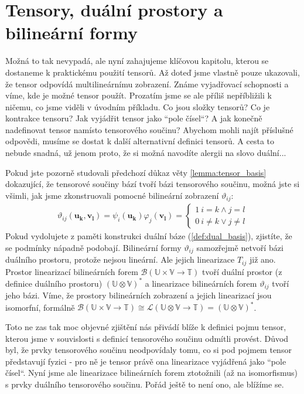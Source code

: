 \documentclass[a5paper,12pt]{amsbook}
\theoremstyle{definition}
\newcommand{\myvec}[1]{\bm{#1}}
\newcommand{\myspace}[1]{\mathbb{#1}}
\begin{document}
\section{Tensory, duální prostory a bilineární formy}

\noindent
Možná to tak nevypadá, ale nyní zahajujeme klíčovou kapitolu, kterou se dostaneme k praktickému
použití tensorů. Až doteď jsme vlastně pouze ukazovali, že tensor odpovídá multilineárnímu
zobrazení. Známe vyjadřovací schopnosti a víme, kde je možné tensor použít. Prozatím jsme
se ale příliš nepříbližili k ničemu, co jsme viděli v úvodním příkladu. Co jsou složky tensorů?
Co je kontrakce tensoru? Jak vyjádřit tensor jako ``pole čísel``? A jak konečně nadefinovat
tensor namísto tensorového součinu? Abychom mohli najít příslušné odpovědi, musíme se dostat
k další alternativní definici tensorů. A cesta to nebude snadná, už jenom proto, že si možná
navodíte alergii na slovo duální...

Pokud jste pozorně studovali předchozí důkaz věty \ref{lemma:tensor_basis} dokazující, že
tensorové součiny bází tvoří bázi tensorového součinu, možná jste si všimli, jak jsme zkonstruovali
pomocné bilineární zobrazení $\vartheta_{ij}$:
\begin{equation*}
\begin{split}
\vartheta_{ij}(\myvec{u_k}, \myvec{v_l}) = \psi_i(\myvec{u_k})\varphi_j(\myvec{v_l}) =
\begin{cases}
1 \: i = k \wedge j = l \\
0 \: i \neq k \vee j \neq l
\end{cases}
\end{split}
\end{equation*}
Pokud vydolujete z paměti konstrukci duální báze (\ref{def:dual_basis}), zjistíte, že se podmínky
nápadně podobají. Bilineární formy $\vartheta_{ij}$ samozřejmě netvoří bázi duálního prostoru,
protože nejsou lineární. Ale jejich linearizace $T_{ij}$ již ano. Prostor linearizací bilineárních
forem $\mathcal{B}(\myspace{U}\times\myspace{V}\rightarrow\myspace{T})$ tvoří duální prostor
(z definice duálního prostoru) $(\myspace{U}\otimes\myspace{V})^*$ a linearizace bilineárních
forem $\vartheta_{ij}$ tvoří jeho bázi. Víme, že prostory bilineárních zobrazení a jejich linearizací
jsou isomorfní, formálně $\mathcal{B}(\myspace{U}\times\myspace{V}\rightarrow\myspace{T})\cong
\mathcal{L}(\myspace{U}\otimes\myspace{V}\rightarrow\myspace{T}) = (\myspace{U}\otimes\myspace{V})^*$.

Toto ne zas tak moc objevné zjištění nás přivádí blíže k definici pojmu tensor, kterou jsme v souvislosti
s definicí tensorového součinu odmítli provést. Důvod byl, že prvky tensorového součinu neodpovídaly
tomu, co si pod pojmem tensor představují fyzici - pro ně je tensor právě ona linearizace vyjádřená
jako ``pole čísel``. Nyní jsme ale linearizace bilineárních forem ztotožnili (až na isomorfismus)
s prvky duálního tensorového součinu. Pořád ještě to není ono, ale blížíme se.
\end{document}
